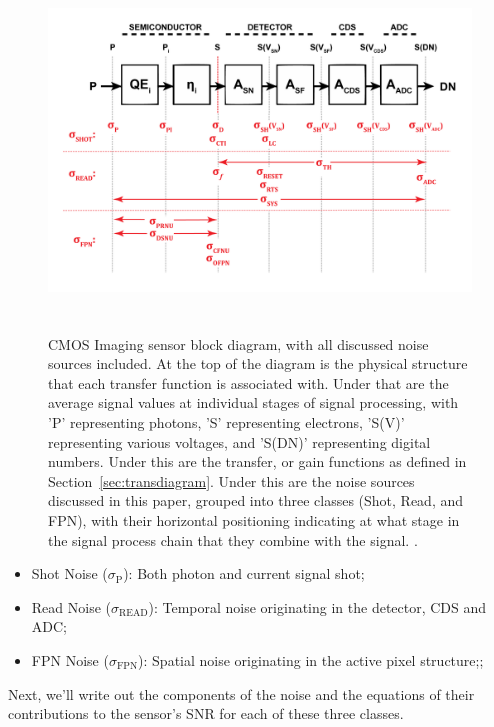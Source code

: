 \documentclass[10pt]{article}
\begin{document}
\begin{figure}[!t]
    \centering
        \includegraphics[height=3.75in]{assets/Block Diagram Full Noise.png}
    \caption{CMOS Imaging sensor block diagram, with all discussed noise sources included. At the top of the diagram is the physical structure that each transfer function is associated with. Under that are the average signal values at individual stages of signal processing, with 'P' representing photons, 'S' representing electrons, 'S(V)' representing various voltages, and 'S(DN)' representing digital numbers. Under this are the transfer, or gain functions as defined in Section~\ref{sec:transdiagram}. Under this are the noise sources discussed in this paper, grouped into three classes (Shot, Read, and FPN), with their horizontal positioning indicating at what stage in the signal process chain that they combine with the signal. \cite{janesick}.}
    \label{fig:BlockFull}
\end{figure}

\begin{itemize}[noitemsep]
\item Shot Noise (\boldmath $\sigma_{\text{P}}$): Both photon and current signal shot;
\item Read Noise (\boldmath $\sigma_{\text{READ}}$): Temporal noise originating in the detector, CDS and ADC;
\item FPN Noise (\boldmath $\sigma_{\text{FPN}}$): Spatial noise originating in the active pixel structure;;
\end{itemize}

Next, we'll write out the components of the noise and the equations of their contributions to the sensor's SNR for each of these three classes.
\end{document}
